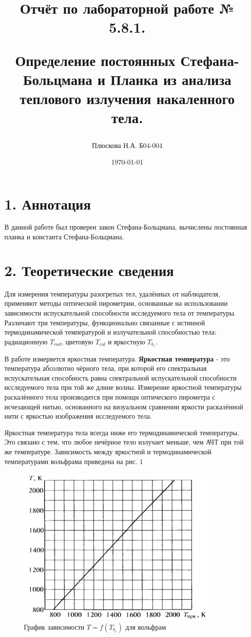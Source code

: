 \documentclass[a4paper,12pt]{report}
\title{Отчёт по лабораторной работе № 5.8.1. 

Определение постоянных Стефана-Больцмана и Планка из анализа теплового излучения накаленного тела.}
\author{Плюскова Н.А. Б04-004 }
\date{\today}
\begin{document}
\maketitle
\section*{1. Аннотация}
В данной работе был проверен закон Стефана-Больцмана, вычислены постоянная планка и константа Стефана-Больцмана.


\section*{2. Теоретические сведения}
Для измерения температуры разогретых тел, удалённых от наблюдателя, применяют методы оптической пирометрии, основанные на использовании зависимости испускательной способности исследуемого тела от температуры. Различают три температуры, функционально связанные с истинной термодинамической температурой и излучательной способностью тела: радиационную $T_{rad}$, цветовую $T_{col}$ и яркостную $T_b_r$. \par
В работе измеряется яркостная температура. \textbf{Яркостная температура} - это температура абсолютно чёрного тела, при которой его спектральная испускательная способность равна спектральной испускательной способности исследуемого тела при той же длине волны.
 Измерение яркостной температуры раскалённого тела производится при помощи оптического пирометра с исчезающей нитью, основанного на визуальном сравнении яркости раскалённой нити с яркостью изображения исследуемого тела. \par
Яркостная температура тела всегда ниже его термодинамической температуры. Это связано с тем, что любое нечёрное тело излучает меньше, чем АЧТ при той же температуре. Зависимость между яркостной и термодинамической температурами вольфрама приведена на рис. 1

\begin{figure}[h]
    \centering
    \includegraphics[width=10cm]{fig2.PNG}
    \caption{График зависимости $T = f(T_b_r)$ для вольфрам}
    \label{fig:vac}
\end{figure}
\end{document}
